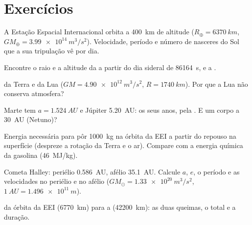 \section{Exercícios}

\begin{exercise}[$\star$]\label{exo:b1:central-forces:1}
A Estação Espacial Internacional orbita a \qty{400}{km} de altitude
($R_\oplus = \qty{6370}{km}$, $GM_\oplus = \qty{3.99e14}{m^3/s^2}$). Velocidade,
período e número de nasceres do Sol que a sua tripulação vê por dia.
\end{exercise}

\begin{exercise}[$\star$]\label{exo:b1:central-forces:2}
Encontre o raio e a altitude da  a partir do
dia sideral de \qty{86164}{s}, e a .
\end{exercise}

\begin{exercise}[$\star$]\label{exo:b1:central-forces:3}
 da Terra e da Lua ($GM = \qty{4.90e12}{m^3/s^2}$,
$R = \qty{1740}{km}$). Por que a Lua não conserva atmosfera?
\end{exercise}

\begin{exercise}[$\star$]\label{exo:b1:central-forces:4}
Marte tem $a = \qty{1.524}{AU}$ e Júpiter \qty{5.20}{AU}: os seus anos, pela
. E um corpo a \qty{30}{AU} (Netuno)?
\end{exercise}

\begin{exercise}[$\star\star$]\label{exo:b1:central-forces:5}
Energia necessária para pôr \qty{1000}{kg} na órbita da EEI a partir do
repouso na superfície (despreze a rotação da Terra e o ar). Compare
com a energia química da gasolina (\qty{46}{MJ/kg}).
\end{exercise}

\begin{exercise}[$\star\star$]\label{exo:b1:central-forces:6}
Cometa Halley: periélio \qty{0.586}{AU}, afélio \qty{35.1}{AU}.
Calcule $a$, $e$, o período e as velocidades no periélio e no afélio
($GM_\odot = \qty{1.33e20}{m^3/s^2}$, $\qty{1}{AU} = \qty{1.496e11}{m}$).
\end{exercise}

\begin{exercise}[$\star\star$]\label{exo:b1:central-forces:7}
 da órbita da EEI (\qty{6770}{km}) para a
 (\qty{42200}{km}): as duas queimas, o total e a duração.
\end{exercise}

